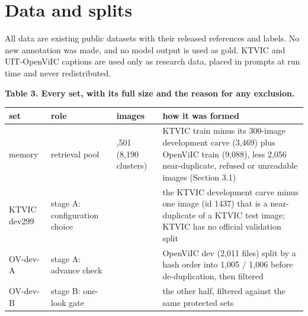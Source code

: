 \documentclass[manuscript,screen]{acmart}
\begin{document}
\section{Data and splits}\label{data-and-splits}

All data are existing public datasets with their released references and labels. No new annotation
was made, and no model output is used as gold. KTVIC and UIT-OpenViIC captions are used only as
research data, placed in prompts at run time and never redistributed.

\textbf{Table 3. Every set, with its full size and the reason for any exclusion.}

\begin{longtable}[]{@{}
  >{\raggedright\arraybackslash}p{}
  >{\raggedright\arraybackslash}p{}
  >{\raggedright\arraybackslash}p{}
  >{\raggedright\arraybackslash}p{}@{}}
\toprule\noalign{}
\begin{minipage}[b]{\linewidth}\raggedright
set
\end{minipage} & \begin{minipage}[b]{\linewidth}\raggedright
role
\end{minipage} & \begin{minipage}[b]{\linewidth}\raggedright
images
\end{minipage} & \begin{minipage}[b]{\linewidth}\raggedright
how it was formed
\end{minipage} \\
\midrule\noalign{}
\endhead
\bottomrule\noalign{}
\endlastfoot
memory & retrieval pool & 10,501 (8,190 clusters) & KTVIC train minus its 300-image development
carve (3,469) plus OpenViIC train (9,088), less 2,056 near-duplicate, refused or unreadable images
(Section 3.1) \\
KTVIC dev299 & stage A: configuration choice & 299 & the KTVIC development carve minus one image (id
1437) that is a near-duplicate of a KTVIC test image; KTVIC has no official validation split \\
OV-dev-A & stage A: advance check & 911 & OpenViIC dev (2,011 files) split by a hash order into
1,005 / 1,006 before de-duplication, then filtered \\
OV-dev-B & stage B: one-look gate & 925 & the other half, filtered against the same protected
sets \\

\end{longtable}
\end{document}
